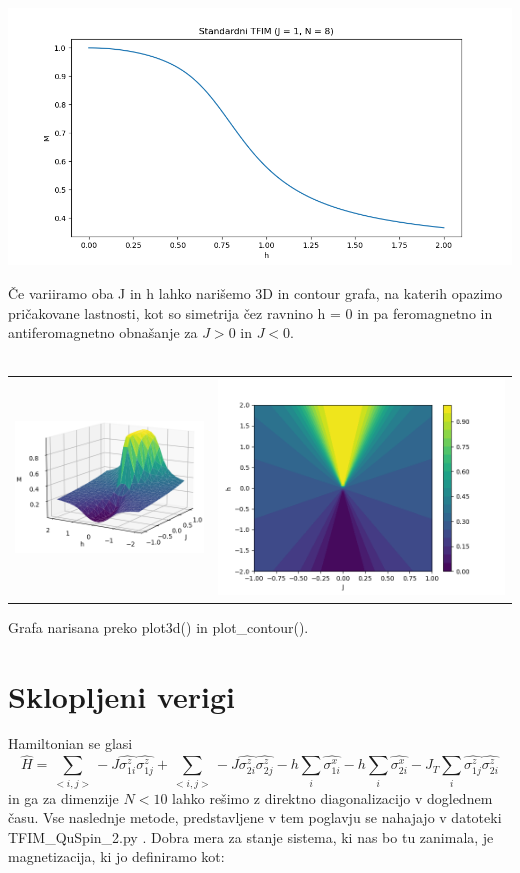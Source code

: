 \documentclass{article}
\begin{document}
\includegraphics[width = \linewidth]{STFIM1.png}

\newpage
\noindent Če variiramo oba J in h lahko narišemo 3D in contour grafa, na katerih opazimo pričakovane lastnosti, kot so simetrija čez ravnino h = 0 in pa feromagnetno in antiferomagnetno obnašanje za $J > 0$ in $J < 0$.\\\\

\begin{tabular}{c c}
     \includegraphics[width = .5 \linewidth]{STFIM2.png}
     &  
     \includegraphics[width = .5 \linewidth]{STFIM3.png}\\
\end{tabular}
Grafa narisana preko plot3d() in plot\_contour().


\section{Sklopljeni verigi}
Hamiltonian se glasi
\begin{equation}
    \hat{H} = \sum_{< i,j >} -J \hat{\sigma_{1i}^z} \hat{\sigma_{1j}^z} + \sum_{< i,j >} -J \hat{\sigma_{2i}^z} \hat{\sigma_{2j}^z} - h\sum_i \hat{\sigma_{1i}^x}- h\sum_i \hat{\sigma_{2i}^x} - J_T \sum_i \hat{\sigma_{1j}^z} \hat{\sigma_{2i}^z}
\end{equation}
in ga za dimenzije $N < 10$ lahko rešimo z direktno diagonalizacijo v doglednem času. Vse naslednje metode, predstavljene v tem poglavju se nahajajo v datoteki TFIM\_QuSpin\_2.py . Dobra mera za stanje sistema, ki nas bo tu zanimala, je magnetizacija, ki jo definiramo kot:
\end{document}
